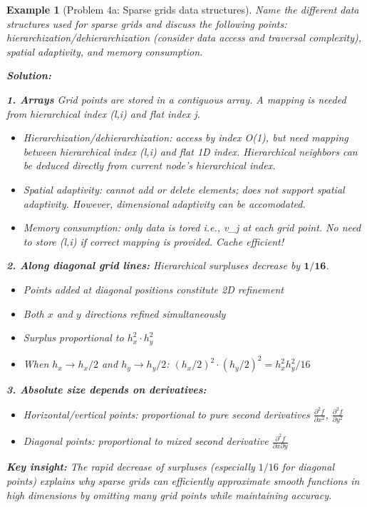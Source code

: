\documentclass[11pt,a4paper]{article}
\newtheorem{example}[theorem]{Example}
\begin{document}
\begin{example}[Problem 4a: Sparse grids data structures]
    Name the different data structures used for sparse grids and discuss the following points: hierarchization/dehierarchization (consider data access and traversal complexity), spatial adaptivity, and memory consumption. 
   
   \textbf{Solution:}
   
   \textbf{1. Arrays} Grid points are stored in a contiguous array. A mapping is needed from hierarchical index (l,i) and flat index j.
   \begin{itemize}
       \item Hierarchization/dehierarchization: access by index O(1), but need mapping between hierarchical index (l,i) and flat 1D index. Hierarchical neighbors can be deduced directly from current node's hierarchical index.
       \item Spatial adaptivity: cannot add or delete elements; does not support spatial adaptivity. However, dimensional adaptivity can be accomodated.
       \item Memory consumption: only data is tored i.e., v_j at each grid point. No need to store (l,i) if correct mapping is provided. Cache efficient!
   \end{itemize}
   
   \textbf{2. Along diagonal grid lines:} Hierarchical surpluses decrease by $\mathbf{1/16}$.
   \begin{itemize}
       \item Points added at diagonal positions constitute 2D refinement
       \item Both $x$ and $y$ directions refined simultaneously
       \item Surplus proportional to $h_x^2 \cdot h_y^2$
       \item When $h_x \to h_x/2$ and $h_y \to h_y/2$: $(h_x/2)^2 \cdot (h_y/2)^2 = h_x^2 h_y^2/16$
   \end{itemize}
   
   \textbf{3. Absolute size depends on derivatives:}
   \begin{itemize}
       \item Horizontal/vertical points: proportional to pure second derivatives $\frac{\partial^2 f}{\partial x^2}$, $\frac{\partial^2 f}{\partial y^2}$
       \item Diagonal points: proportional to mixed second derivative $\frac{\partial^2 f}{\partial x \partial y}$
   \end{itemize}
   
   \textbf{Key insight:} The rapid decrease of surpluses (especially $1/16$ for diagonal points) explains why sparse grids can efficiently approximate smooth functions in high dimensions by omitting many grid points while maintaining accuracy.
\end{example}
\end{document}
